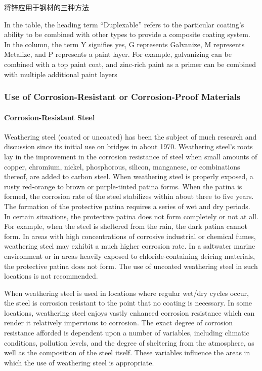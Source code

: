 \begin{table}
  \caption{将锌应用于钢材的三种方法}
  \label{tab:apply-zinc-to-steel}
\end{table}

In the table, the heading term “Duplexable” refers to the particular coating’s ability to be combined with other
types to provide a composite coating system. In the column, the term Y signifies yes, G represents Galvanize, M
represents Metalize, and P represents a paint layer. For example, galvanizing can be combined with a top paint coat,
and zinc-rich paint as a primer can be combined with multiple additional paint layers

\subsubsection{Use of Corrosion-Resistant or Corrosion-Proof Materials}

\paragraph{Corrosion-Resistant Steel}
Weathering steel (coated or uncoated) has been the subject of much research and discussion since its initial use
on bridges in about 1970. Weathering steel’s roots lay in the improvement in the corrosion resistance of steel when
small amounts of copper, chromium, nickel, phosphorous, silicon, manganese, or combinations thereof, are added to
carbon steel. When weathering steel is properly exposed, a rusty red-orange to brown or purple-tinted patina forms.
When the patina is formed, the corrosion rate of the steel stabilizes within about three to five years. The formation of
the protective patina requires a series of wet and dry periods. In certain situations, the protective patina does not form
completely or not at all. For example, when the steel is sheltered from the rain, the dark patina cannot form. In areas
with high concentrations of corrosive industrial or chemical fumes, weathering steel may exhibit a much higher
corrosion rate. In a saltwater marine environment or in areas heavily exposed to chloride-containing deicing
materials, the protective patina does not form. The use of uncoated weathering steel in such locations is not
recommended.

When weathering steel is used in locations where regular wet/dry cycles occur, the steel is corrosion resistant to
the point that no coating is necessary. In some locations, weathering steel enjoys vastly enhanced corrosion resistance
which can render it relatively impervious to corrosion. The exact degree of corrosion resistance afforded is dependent
upon a number of variables, including climatic conditions, pollution levels, and the degree of sheltering from the
atmosphere, as well as the composition of the steel itself. These variables influence the areas in which the use of
weathering steel is appropriate.

